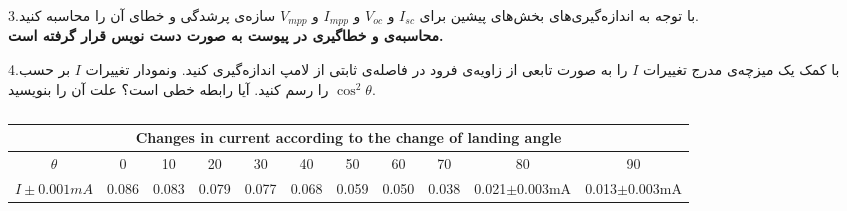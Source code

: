 \documentclass{article}
\begin{document}
	
3.با توجه به اندازه‌گیری‌های بخش‌های پیشین برای $I_{sc}$ و $V_{oc}$ و $I_{mpp}$ و $V_{mpp}$ سازه‌ی پرشدگی و خطای آن را محاسبه کنید. \\
\textbf{محاسبه‌ی  و خطاگیری در پیوست به صورت دست نویس قرار گرفته است.}
	
	4.با کمک یک میزچه‌ی مدرج تغییرات $I$ را به صورت تابعی از زاویه‌ی فرود در فاصله‌ی ثابتی از لامپ اندازه‌گیری کنید. ونمودار تغییرات $I$ بر حسب $\cos^2 {\theta}$ را رسم کنید. آیا رابطه خطی است؟ علت آن را بنویسید.
	
\begin{latin}
\vspace{3cm}
\begin{center}
\begin{table}[h!]
\centering
\setlength{\tabcolsep}{8pt}
\renewcommand{\arraystretch}{2}
\begin{tabular}{|c|c|c|c|c|c|c|c|c|c|c|}
\hline
\multicolumn{11}{|c|}{Changes in current according to the change of landing angle} \\
\hline
$\theta$&0&10&20&30&40&50&60&70&80&90\\
\hline
$I\pm0.001mA$&0.086&0.083&0.079&0.077&0.068&0.059&0.050&0.038&0.021$\pm$0.003mA&0.013$\pm$0.003mA\\
\hline
\end{tabular}
\caption{}
\end{table}
\end{center}
\end{latin}
\end{document}
